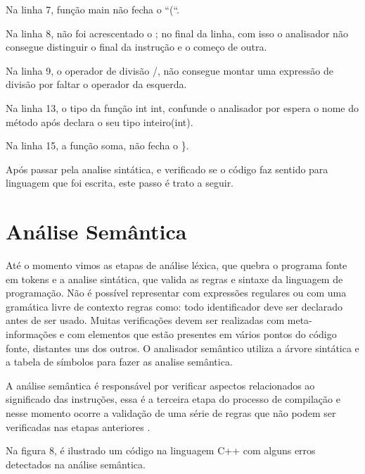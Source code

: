 \documentclass[12pt,oneside,a4paper,chapter=TITLE,section=TITLE,sumario=tradicional]{abntex2}
\begin{document}
\begin{lista}
	\item Na linha 7, função main não fecha o “(“.
	\item Na linha 8, não foi acrescentado o ; no final da linha, com isso o analisador não consegue distinguir o final da instrução e o começo de outra.
	\item Na linha 9, o operador de divisão /, não consegue montar uma expressão de divisão por faltar o operador da esquerda. 
	\item Na linha 13, o tipo da função int int, confunde o analisador por espera o nome do método após declara o seu tipo inteiro(int).
	\item Na linha 15, a função soma, não fecha o \}.
\end{lista}

Após passar pela analise sintática, e verificado se o código faz sentido para linguagem que foi escrita, este passo é trato a seguir.

\section{Análise Semântica}
\label{sec:analise-semantica}

Até o momento vimos as etapas de análise léxica, que quebra o programa fonte em tokens e a analise sintática, que valida as regras e sintaxe da linguagem de programação. Não é possível representar com expressões regulares ou com uma gramática livre de contexto regras como: todo identificador deve ser declarado antes de ser usado. Muitas verificações devem ser realizadas com meta-informações e com elementos que estão presentes em vários pontos do código fonte, distantes uns dos outros. O analisador semântico utiliza a árvore sintática e a tabela de símbolos para fazer as analise semântica. 

A análise semântica é responsável por verificar aspectos relacionados ao significado das instruções, essa é a terceira etapa do processo de compilação e nesse momento ocorre a validação de uma série de regras que não podem ser verificadas nas etapas anteriores \cite{maragon2015}.

Na figura 8, é ilustrado um código na linguagem C++ com alguns erros detectados na análise semântica.

\begin{figure}[htb]
\end{figure}
\end{document}
